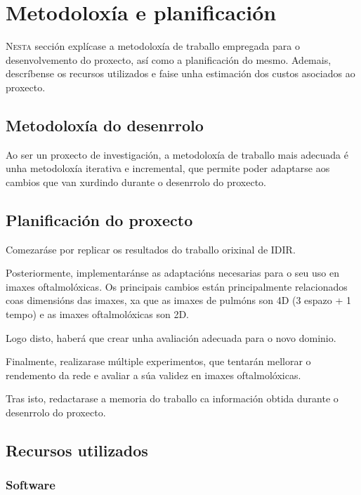 \chapter{Metodoloxía e planificación}
\label{chap:Metodoloxía e planificación}
\lettrine{N}{esta} sección explícase a metodoloxía de traballo empregada para o desenvolvemento do proxecto, así como a planificación do mesmo.
 Ademais, descríbense os recursos utilizados e faise unha estimación dos custos asociados ao proxecto.

\section{Metodoloxía do desenrrolo}
\label{sec:Metodoloxía do desenrrolo}

Ao ser un proxecto de investigación, a metodoloxía de traballo mais adecuada é unha metodoloxía iterativa e incremental, que permite poder adaptarse aos cambios que van xurdindo durante o desenrrolo do proxecto.

\section{Planificación do proxecto}
\label{sec:Planificación do proxecto}

Comezaráse por replicar os resultados do traballo orixinal de IDIR.

Posteriormente, implementaránse as adaptacións necesarias para o seu uso en imaxes oftalmolóxicas. Os principais cambios están principalmente relacionados coas dimensións das imaxes, xa que as imaxes de pulmóns son 4D (3 espazo + 1 tempo) e as imaxes oftalmolóxicas son 2D.

Logo disto, haberá que crear unha avaliación adecuada para o novo dominio. 

Finalmente, realizarase múltiple experimentos, que tentarán mellorar o rendemento da rede e avaliar a súa validez en imaxes oftalmolóxicas.

Tras isto, redactarase a memoria do traballo ca información obtida durante o desenrrolo do proxecto.

\section{Recursos utilizados}
\label{sec:Recursos utilizados}

\subsection{Software}
\label{subsec:Software}

